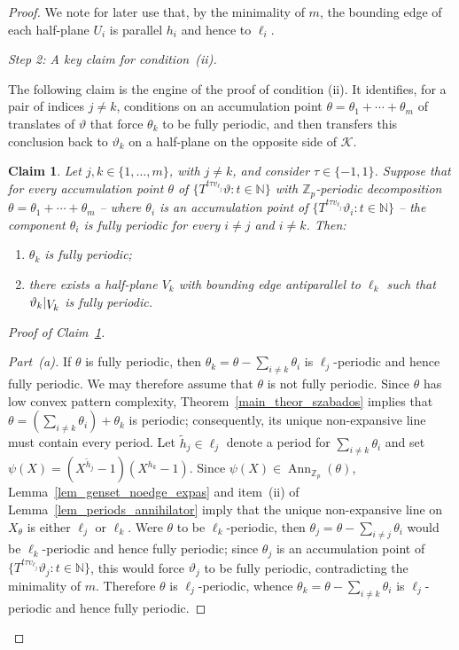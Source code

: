 \documentclass[12pt]{amsart}
\numberwithin{equation}{section}
\newtheorem{claim}[theorem]{Claim}
\DeclareMathOperator{\Ann}{Ann}
\newcommand{\bb}[1]{\mathbb{#1}}
\newcommand{\sob}[1]{\ensuremath{{\mathbin |}\raise-.4ex\hbox{$#1$}}}
\begin{document}
\begin{proof}
We note for later use that, by the minimality of $m$, the bounding edge of each half-plane $U_i$ is parallel $ h_i$ and hence to $\pmb{\ell}_i$. 

\medskip
\noindent\textit{Step 2: A key claim for condition~\textup{(ii)}.}

\smallskip

The following claim is the engine of the proof of condition (ii). It identifies, for a pair of indices $ j \neq k $, conditions on an accumulation point $ \theta = \theta_1 + \cdots + \theta_m $ of translates of $ \vartheta $ that force $ \theta_k $ to be fully periodic, and then transfers this conclusion back to $ \vartheta_k $ on a half-plane on the opposite side of $\mathcal K$.

\begin{claim}\label{claim_zeta_k_fully_periodic}
Let $j,k \in \{1, \ldots, m\}$, with $j \neq k$, and consider $\tau \in \{-1,1\}$. Suppose that for every accumulation point $\theta$ of $\{T^{t\tau v_{\pmb{\ell}_{j}}}\vartheta : t \in \bb{N}\}$ with $\bb{Z}_p$-periodic decomposition $\theta = \theta_1+\cdots+\theta_m$ -- where $\theta_i$ is an accumulation point of $\{T^{t\tau v_{\pmb{\ell}_{j}}}\vartheta_i : t \in \bb{N}\}$ -- the component $\theta_i$ is fully periodic for every $i \neq j$ and $i \neq k$. Then:
\begin{enumerate}[label=(\alph*), itemsep=5pt]
	\item $\theta_k$ is fully periodic;
	\item there exists a half-plane $V_k $ with bounding edge antiparallel to $\pmb{\ell}_k$ such that $\vartheta_k\sob{V_k}$ is fully periodic.
\end{enumerate}
\end{claim}

\begin{proof}[Proof of Claim~\ref{claim_zeta_k_fully_periodic}] \

\textit{Part~(a).}
If $\theta$ is fully periodic, then $\theta_k = \theta - \sum_{i \neq k} \theta_i$ is $\ell_{j}$-periodic and hence fully periodic. We may therefore assume that $\theta$ is not fully periodic. Since $\theta$ has low convex pattern complexity, Theorem~\ref{main_theor_szabados} implies that $\theta = (\sum_{i \neq k} \theta_i)+\theta_k$ is periodic; consequently, its unique non-expansive line must contain every period. Let $\tilde{h}_{j} \in \ell_{j}$ denote a period for $\sum_{i \neq k} \theta_i$ and set $\psi(X) = (X^{\tilde{h}_j}-1)(X^{h_k}-1)$. Since $\psi(X) \in \Ann_{\bb{Z}_p}(\theta)$, Lemma~\ref{lem_genset_noedge_expas} and item~(ii) of Lem\-ma~\ref{lem_periods_annihilator} imply that the unique non-expansive line on $X_\theta$ is either $\ell_{j}$ or $\ell_k$. Were $\theta$ to be $\ell_k$-periodic, then $\theta_{j} = \theta -\sum_{i \neq j} \theta_i$ would be $\ell_k$-periodic and hence fully periodic; since $\theta_{j}$ is an accumulation point of $\{T^{t\tau v_{\pmb{\ell}_j}}\vartheta_j : t \in \bb{N}\}$, this would force $\vartheta_j$ to be fully periodic, contradicting the minimality of $m$. Therefore $\theta$ is $\ell_{j}$-periodic, whence $\theta_k = \theta - \sum_{i \neq k} \theta_i$ is $\ell_j$-periodic and hence fully periodic. 


\end{proof}
\end{proof}
\end{document}
